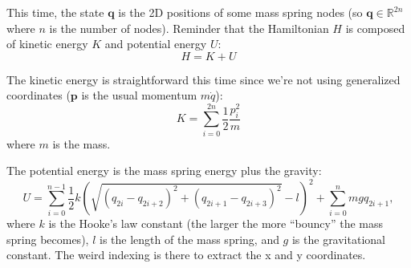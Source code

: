 This time, the state $\mathbf{q}$ is the 2D positions of some mass spring nodes (so $\mathbf{q} \in \mathbb{R}^{2n}$ where $n$ is the number of nodes). Reminder that the Hamiltonian $H$ is composed of kinetic energy $K$ and potential energy $U$:
\begin{equation}
H = K + U
\end{equation}

The kinetic energy is straightforward this time since we're not using generalized coordinates ($\mathbf{p}$ is the usual momentum $m \dot{q}$):
\begin{equation}
K = \sum_{i=0}^{2n} \frac{1}{2} \frac{p_i^2}{m}
\end{equation}
where $m$ is the mass.

The potential energy is the mass spring energy plus the gravity:
\begin{equation}
U = \sum_{i=0}^{n-1} \frac{1}{2} k \left(\sqrt{\left(q_{2i} - q_{2i + 2}\right)^2 + \left(q_{2i+1} - q_{2i+3}\right)^2} - l\right)^2 + \sum_{i=0}^{n} m g q_{2i+1},
\end{equation}
where $k$ is the Hooke's law constant (the larger the more ``bouncy'' the mass spring becomes), $l$ is the length of the mass spring, and $g$ is the gravitational constant. The weird indexing is there to extract the x and y coordinates.

